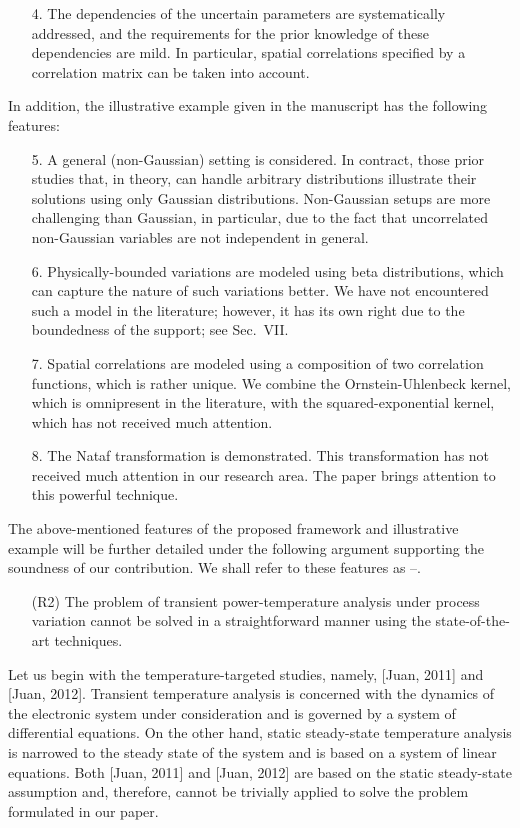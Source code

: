 \begin{authors}
\begin{itemize}
  \item[4.] The dependencies of the uncertain parameters are systematically addressed, and the requirements for the prior knowledge of these dependencies are mild.
  In particular, spatial correlations specified by a correlation matrix can be taken into account.
\end{itemize}

In addition, the illustrative example given in the manuscript has the following features:
\begin{itemize}
  \item[5.] A general (non-Gaussian) setting is considered.
  In contract, those prior studies that, in theory, can handle arbitrary distributions illustrate their solutions using only Gaussian distributions.
  Non-Gaussian setups are more challenging than Gaussian, in particular, due to the fact that uncorrelated non-Gaussian variables are not independent in general.

  \item[6.] Physically-bounded variations are modeled using beta distributions, which can capture the nature of such variations better.
  We have not encountered such a model in the literature; however, it has its own right due to the boundedness of the support; see Sec.~VII.

  \item[7.] Spatial correlations are modeled using a composition of two correlation functions, which is rather unique.
  We combine the Ornstein-Uhlenbeck kernel, which is omnipresent in the literature, with the squared-exponential kernel, which has not received much attention.

  \item[8.] The Nataf transformation is demonstrated.
  This transformation has not received much attention in our research area.
  The paper brings attention to this powerful technique.
\end{itemize}

The above-mentioned features of the proposed framework and illustrative example will be further detailed under the following argument supporting the soundness of our contribution.
We shall refer to these features as --.

\begin{itemize}
  \item[(R2)] The problem of transient power-temperature analysis under process variation cannot be solved in a straightforward manner using the state-of-the-art techniques.
\end{itemize}
Let us begin with the temperature-targeted studies, namely, [Juan, 2011] and [Juan, 2012].
Transient temperature analysis is concerned with the dynamics of the electronic system under consideration and is governed by a system of differential equations.
On the other hand, static steady-state temperature analysis is narrowed to the steady state of the system and is based on a system of linear equations.
Both [Juan, 2011] and [Juan, 2012] are based on the static steady-state assumption and, therefore, cannot be trivially applied to solve the problem formulated in our paper.


\end{authors}
